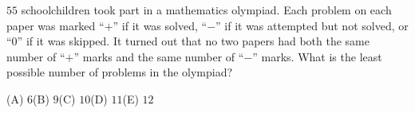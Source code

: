 $55$ schoolchildren took part in a mathematics olympiad. Each problem on each paper was marked ``$+$'' if it was solved, ``$-$'' if it was attempted but not solved, or ``$0$'' if it was skipped. It turned out that no two papers had both the same number of ``$+$'' marks and the same number of ``$-$'' marks. What is the least possible number of problems in the olympiad?

(A) $6$\quad (B) $9$\quad (C) $10$\quad (D) $11$\quad (E) $12$
